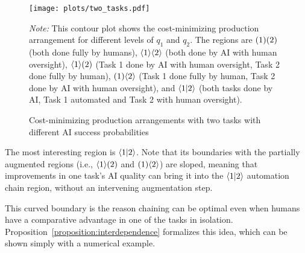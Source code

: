\documentclass{article}
\theoremstyle{plain}
\theoremstyle{plain}
\begin{document}
\begin{figure}[h!]
  \caption{Cost-minimizing production arrangements with two tasks with different AI success probabilities} \label{fig:two_tasks}
  \begin{center}
  \texttt{[image: plots/two\_tasks.pdf]} \\
  \end{center}
\begin{footnotesize}
  \emph{Note:} This contour plot shows the cost-minimizing production arrangement for different levels of \(q_1\) and \(q_2\).
  The regions are \(( 1 )( 2 )\) (both done fully by humans), \(\langle 1 \rangle\langle 2 \rangle\) (both done by AI with human oversight), \(\langle 1 \rangle( 2 )\) (Task 1 done by AI with human oversight, Task 2 done fully by human), \(( 1 )\langle 2 \rangle\) (Task 1 done fully by human, Task 2 done by AI with human oversight), and \(\langle 1|2 \rangle\) (both tasks done by AI, Task 1 automated and Task 2 with human oversight).
\end{footnotesize}
\end{figure}

The most interesting region is \(\langle 1|2 \rangle\).
Note that its boundaries with the partially augmented regions (i.e., \(\langle 1 \rangle( 2 )\) and \(( 1 )\langle 2 \rangle\)) are sloped, meaning that improvements in one task's AI quality can bring it into the \(\langle 1|2 \rangle\) automation chain region, without an intervening augmentation step.

This curved boundary is the reason chaining can be optimal even when humans have a comparative advantage in one of the tasks in isolation.
Proposition~\ref{proposition:interdependence} formalizes this idea, which can be shown simply with a numerical example.
\end{document}
